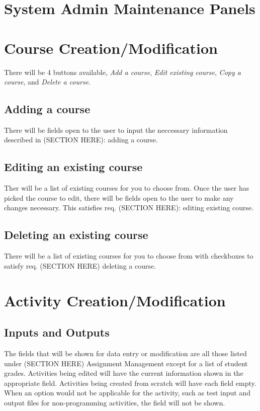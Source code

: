 \documentclass{article}
\begin{document}
\section{System Admin Maintenance Panels}

\section{Course Creation/Modification}
There will be 4 buttons available, \emph{Add a course}, \emph{Edit existing course},
\emph{Copy a course}, and \emph{Delete a course}.

\subsection{Adding a course}
There will be fields open to the user to input the neccessary information described
in (SECTION HERE): adding a course.

\subsection{Editing an existing course}
Ther will be a list of existing courses for you to choose from. Once the user has
picked the course to edit, there will be fields open to the user to make any
changes necessary. This satisfies req.
(SECTION HERE): editing existing course.

\subsection{Deleting an existing course}
There will be a list of existing courses for you to choose from with checkboxes
to satisfy req. (SECTION HERE) deleting a course.

\section{Activity Creation/Modification}
\subsection{Inputs and Outputs}
The fields that will be shown for data entry or modification are all those listed
under (SECTION HERE) Assignment Management except for a list of student grades.
Activities being edited will have the current information shown in the appropriate field.
Activities being created from scratch will have each field empty.
When an option would not be applicable for the activity, such as test input and output files
for non-programming activities, the field will not be shown.
\end{document}
